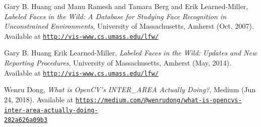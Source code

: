 \documentclass[letterpaper,12pt]{article}
\begin{document}
\begin{thebibliography}{10}
 Gary B. Huang and Manu Ramesh and Tamara Berg and Erik Learned-Miller,
\emph{Labeled Faces in the Wild: A Database for Studying Face Recognition in Unconstrained Environments},
University of Massachusetts, Amherst (Oct, 2007).
Available at \href{http://vis-www.cs.umass.edu/lfw/}{\texttt{http://vis-www.cs.umass.edu/lfw/}}

 Gary B. Huang Erik Learned-Miller,
\emph{Labeled Faces in the Wild: Updates and New Reporting Procedures},
University of Massachusetts, Amherst (May, 2014).
Available at \href{http://vis-www.cs.umass.edu/lfw/}{\texttt{http://vis-www.cs.umass.edu/lfw/}}

 Wenru Dong,
\emph{What is OpenCV’s INTER\_AREA Actually Doing?},
Medium (Jun 24, 2018). Available at \href{https://medium.com/@wenrudong/what-is-opencvs-inter-area-actually-doing-282a626a09b3}{\texttt{https://medium.com/@wenrudong/what-is-opencvs-inter-area-actually-doing-\\282a626a09b3}}

\end{thebibliography}
\end{document}
